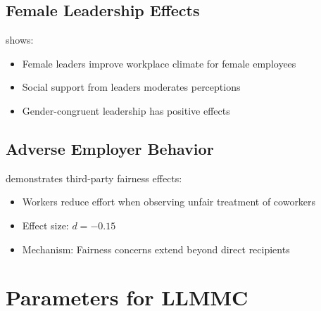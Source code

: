 \subsection{Female Leadership Effects}

\citet{alan2024female} shows:
\begin{itemize}
\item Female leaders improve workplace climate for female employees
\item Social support from leaders moderates perceptions
\item Gender-congruent leadership has positive effects
\end{itemize}

\subsection{Adverse Employer Behavior}

\citet{heinz2020indirect} demonstrates third-party fairness effects:
\begin{itemize}
\item Workers reduce effort when observing unfair treatment of coworkers
\item Effect size: $d = -0.15$
\item Mechanism: Fairness concerns extend beyond direct recipients
\end{itemize}


\section{Parameters for LLMMC}
\label{sec:su-parameters}

